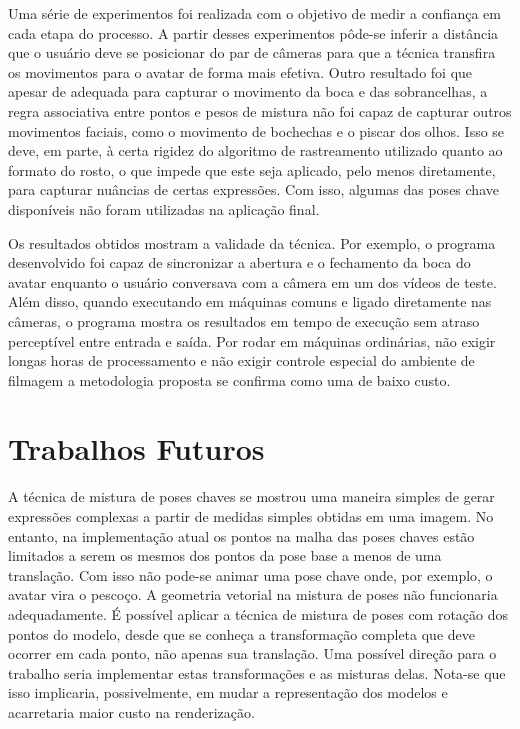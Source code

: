 Uma série de experimentos foi realizada com o objetivo de medir a confiança
em cada etapa do processo. A partir desses experimentos pôde-se inferir a
distância que o usuário deve se posicionar do par de câmeras para que a técnica
transfira os movimentos para o avatar de forma mais efetiva. Outro resultado foi
que apesar de adequada para capturar o movimento da boca e das sobrancelhas, a
regra associativa entre pontos e pesos de mistura não foi capaz de capturar
outros movimentos faciais, como o movimento de bochechas e o piscar dos olhos.
Isso se deve, em parte, à certa rigidez do algoritmo de rastreamento utilizado
quanto ao formato do rosto, o que impede que este seja aplicado, pelo menos
diretamente, para capturar nuâncias de certas expressões. Com isso, algumas das
poses chave disponíveis não foram utilizadas na aplicação final.

Os resultados obtidos mostram a validade da técnica. Por exemplo, o programa
desenvolvido foi capaz de sincronizar a abertura e o fechamento da boca do
avatar enquanto o usuário conversava com a câmera em um dos vídeos de teste.
Além disso, quando executando em máquinas comuns e ligado diretamente nas
câmeras, o programa mostra os resultados em tempo de execução sem atraso
perceptível entre entrada e saída. Por rodar em máquinas ordinárias, não exigir
longas horas de processamento e não exigir controle especial do ambiente de
filmagem a metodologia proposta se confirma como uma de baixo custo.



\section{Trabalhos Futuros}

A técnica de mistura de poses chaves se mostrou uma maneira simples de gerar
expressões complexas a partir de medidas simples obtidas em uma imagem. No
entanto, na implementação atual os pontos na malha das poses chaves estão
limitados a serem os mesmos dos pontos da pose base a menos de uma translação.
Com isso não pode-se animar uma pose chave onde, por exemplo, o avatar vira o
pescoço. A geometria vetorial na mistura de poses não funcionaria adequadamente.
É possível aplicar a técnica de mistura de poses com rotação dos pontos do
modelo, desde que se conheça a transformação completa que deve ocorrer em cada
ponto, não apenas sua translação. Uma possível direção para o trabalho seria
implementar estas transformações e as misturas delas. Nota-se que isso
implicaria, possivelmente, em mudar a representação dos modelos e acarretaria
maior custo na renderização. 

